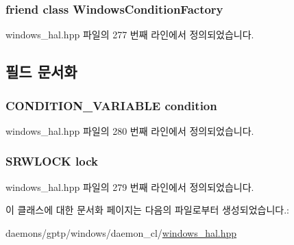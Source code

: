 \subsubsection[{\texorpdfstring{Windows\+Condition\+Factory}{WindowsConditionFactory}}]{\setlength{\rightskip}{0pt plus 5cm}friend class {\bf Windows\+Condition\+Factory}\hspace{0.3cm}{\ttfamily [friend]}}\hypertarget{class_windows_condition_acc3bd90d296b539e00629c9f923797f3}{}\label{class_windows_condition_acc3bd90d296b539e00629c9f923797f3}


windows\+\_\+hal.\+hpp 파일의 277 번째 라인에서 정의되었습니다.



\subsection{필드 문서화}
\subsubsection[{\texorpdfstring{condition}{condition}}]{\setlength{\rightskip}{0pt plus 5cm}C\+O\+N\+D\+I\+T\+I\+O\+N\+\_\+\+V\+A\+R\+I\+A\+B\+LE condition\hspace{0.3cm}{\ttfamily [private]}}\hypertarget{class_windows_condition_aa20c95b787df750c845ec1e9e085162b}{}\label{class_windows_condition_aa20c95b787df750c845ec1e9e085162b}


windows\+\_\+hal.\+hpp 파일의 280 번째 라인에서 정의되었습니다.

\subsubsection[{\texorpdfstring{lock}{lock}}]{\setlength{\rightskip}{0pt plus 5cm}S\+R\+W\+L\+O\+CK lock\hspace{0.3cm}{\ttfamily [private]}}\hypertarget{class_windows_condition_afed18a2dbad108768defb51810a7a760}{}\label{class_windows_condition_afed18a2dbad108768defb51810a7a760}


windows\+\_\+hal.\+hpp 파일의 279 번째 라인에서 정의되었습니다.



이 클래스에 대한 문서화 페이지는 다음의 파일로부터 생성되었습니다.\+:\begin{DoxyCompactItemize}
\item 
daemons/gptp/windows/daemon\+\_\+cl/\hyperlink{windows__hal_8hpp}{windows\+\_\+hal.\+hpp}\end{DoxyCompactItemize}
